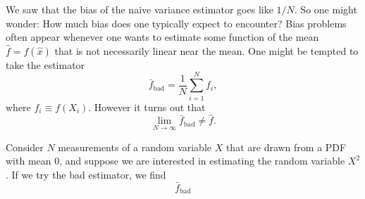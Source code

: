 We saw that the bias of the naive variance estimator goes like $1/N$. 
So one might wonder: How much bias does one typically expect to encounter? 
Bias problems often appear whenever one wants to estimate some function 
of the mean $\hat{f}=f(\hat{x})$ that is not necessarily linear near the 
mean. One might be tempted to take the estimator
\begin{equation}
  \bar{f}_{\text{bad}}=\frac{1}{N}\sum_{i=1}^Nf_i,
\end{equation}
where $f_i\equiv f(X_i)$. However it turns out that
\begin{equation}
  \lim_{N\to\infty}\bar{f}_\text{bad}\neq\hat{f}.
\end{equation}

\begin{example}{}{} Consider $N$ measurements of a random variable $X$ that
are drawn from a PDF with mean 0, and suppose we are interested in estimating 
the random variable $X^2$. If we try the bad estimator, we find
\begin{equation}
  \bar{f}_\text{bad}
\end{equation}
\end{example}


